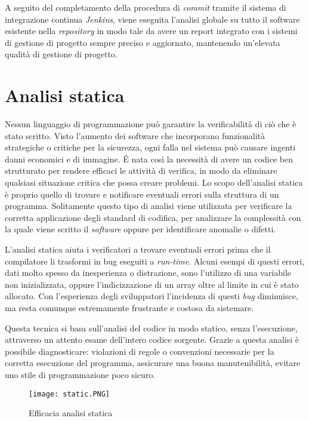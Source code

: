 A seguito del completamento della procedura di \textit{commit} tramite il sistema di integrazione continua \textit{Jenkins}, viene eseguita l'analisi globale su tutto il software esistente nella \textit{repository} in modo tale da avere un report integrato con i sistemi di gestione di progetto sempre preciso e aggiornato, mantenendo un'elevata qualità di gestione di progetto.


\section{Analisi statica}

Nessun linguaggio di programmazione può garantire la verificabilità di ciò che è stato scritto. Visto l'aumento dei software che incorporano funzionalità strategiche o critiche per la sicurezza, ogni falla nel sistema può causare ingenti danni economici e di immagine. É nata così la necessità di avere un codice ben strutturato per rendere efficaci le attività di verifica, in modo da eliminare qualsiasi situazione critica che possa creare problemi. Lo scopo dell'analisi statica è proprio quello di trovare e notificare eventuali errori sulla struttura di un programma. Solitamente questo tipo di analisi viene utilizzata per verificare la corretta applicazione degli standard di codifica, per analizzare la complessità con la quale viene scritto il \textit{software} oppure per identificare anomalie o difetti.

L'analisi statica aiuta i verificatori a trovare eventuali errori prima che il compilatore li trasformi in bug eseguiti a \textit{run-time}. Alcuni esempi di questi errori, dati molto spesso da inesperienza o distrazione, sono l'utilizzo di una variabile non inizializzata, oppure l'indicizzazione di un array oltre al limite in cui è stato allocato. Con l'esperienza degli sviluppatori l'incidenza di questi \textit{bug} diminuisce, ma resta comunque estremamente frustrante e costosa da sistemare.

Questa tecnica si basa sull'analisi del codice in modo statico, senza l'esecuzione, attraverso un attento esame dell'intero codice sorgente. Grazie a questa analisi è possibile diagnosticare: violazioni di regole o convenzioni necessarie per la corretta esecuzione del programma, assicurare una buona manutenibilità, evitare uno stile di programmazione poco sicuro.

\begin{figure}[H]
  \centering
  \texttt{[image: static.PNG]}
  \caption{Efficacia analisi statica}
\end{figure}

